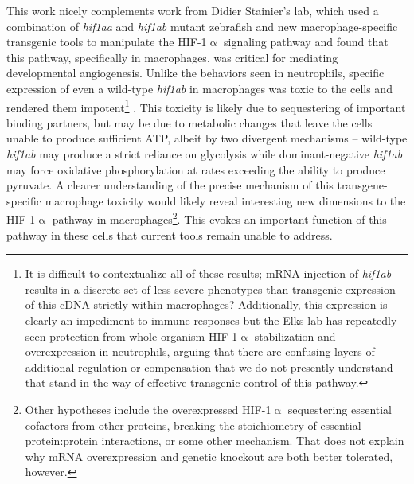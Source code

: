 This work nicely complements work from Didier Stainier's lab, which used a combination of \textit{hif1aa} and \textit{hif1ab} mutant zebrafish and new macrophage\hyp{}specific transgenic tools to manipulate the HIF\hyp{}1$\upalpha$ signaling pathway and found that this pathway, specifically in macrophages, was critical for mediating developmental angiogenesis. Unlike the behaviors seen in neutrophils, specific expression of even a wild\hyp{}type \textit{hif1ab} in macrophages was toxic to the cells and rendered them impotent\footnote{It is difficult to contextualize all of these results; mRNA injection of \textit{hif1ab} results in a discrete set of less-severe phenotypes than transgenic expression of this cDNA strictly within macrophages? Additionally, this expression is clearly an impediment to immune responses but the Elks lab has repeatedly seen protection from whole-organism HIF-1$\upalpha$ stabilization and overexpression in neutrophils, arguing that there are confusing layers of additional regulation or compensation that we do not presently understand that stand in the way of effective transgenic control of this pathway.} \citep{Gerri2017}. This toxicity is likely due to sequestering of important binding partners, but may be due to metabolic changes that leave the cells unable to produce sufficient ATP, albeit by two divergent mechanisms -- wild\hyp{}type \textit{hif1ab} may produce a strict reliance on glycolysis while dominant\hyp{}negative \textit{hif1ab} may force oxidative phosphorylation at rates exceeding the ability to produce pyruvate. A clearer understanding of the precise mechanism of this transgene-specific macrophage toxicity would likely reveal interesting new dimensions to the HIF-1$\upalpha$ pathway in macrophages\footnote{Other hypotheses include the overexpressed HIF-1$\upalpha$ sequestering essential cofactors from other proteins, breaking the stoichiometry of essential protein:protein interactions, or some other mechanism. That does not explain why mRNA overexpression and genetic knockout are both better tolerated, however.}. This evokes an important function of this pathway in these cells that current tools remain unable to address. 

